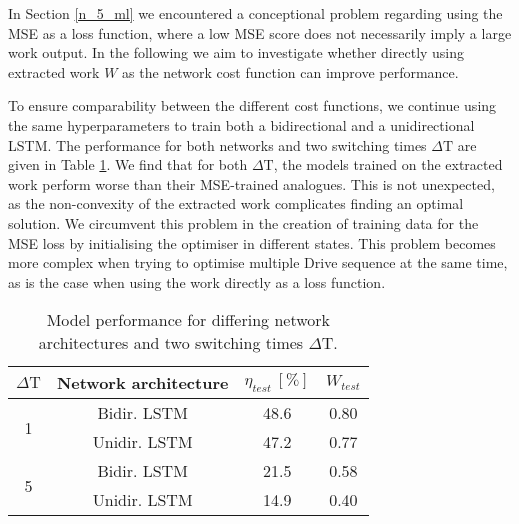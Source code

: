 In Section \ref{n_5_ml} we encountered a conceptional problem regarding using the MSE as a loss function, where a low MSE score does not necessarily imply a large work output.
In the following we aim to investigate whether directly using extracted work $W$ as the network cost function can improve performance.

To ensure comparability between the different cost functions, we continue using the same hyperparameters to train both a bidirectional and a unidirectional LSTM.
The performance for both networks and two switching times $\Delta \mathrm{T}$ are given in Table \ref{workcosttable}.
We find that for both $\Delta \mathrm{T}$, the models trained on the extracted work perform worse than their MSE-trained analogues.
This is not unexpected, as the non-convexity of the extracted work complicates finding an optimal solution.
We circumvent this problem in the creation of training data for the MSE loss by initialising the optimiser in different states.
This problem becomes more complex when trying to optimise multiple Drive sequence at the same time, as is the case when using the work directly as a loss function.

\begin{table}[h]
	\centering
	\begin{tabular}{c | c | c | c }
		$\Delta \mathrm{T}$ & Network architecture        & $\eta_{test} \ [\%]$ & $W_{test}$ \\
		\hline
		\multirow{2}{*}{1}  & Bidir. LSTM                 &    48.6              & 0.80  \\
		                    & Unidir. LSTM                &    47.2              & 0.77  \\
		\hline
		\multirow{2}{*}{5}  & Bidir. LSTM                 &    21.5              & 0.58  \\
		                    & Unidir. LSTM                &    14.9              & 0.40  \\
	\end{tabular}
	\caption{Model performance for differing network architectures and two switching times $\Delta \mathrm{T}$.}
	\label{workcosttable}
\end{table}